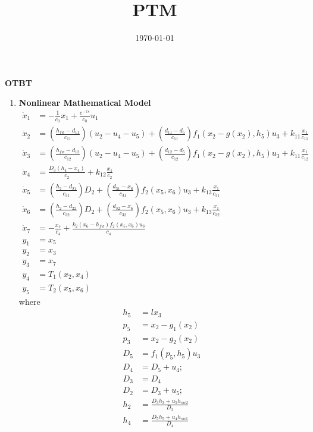 \documentclass[11pt, a4paper, fleqn]{article}
\author{}
\title{PTM \exercise}
\date{\today}
\newcommand{\exercise}{OTBT}
\begin{document}
\begin{center}
	{\Large \bfseries \exercise}\\
	\vspace{6pt}
\end{center}

\begin{enumerate}

\item \textbf{Nonlinear Mathematical Model}
	\begin{align*}
	\dot{x}_1 &= - \frac{1}{c_0}x_1 + \frac{e^{-\tau s}}{c_0}u_1\\
	\dot{x}_2 &= \left( \frac{h_{fw} - d_{11}}{c_{11}} \right) (u_2-u_4-u_5) + \left( \frac{d_{11} - d_5}{c_{11}} \right) f_1(x_2-g(x_2), h_5)u_3 + k_{11}\frac{x_1}{c_{11}}\\
	\dot{x}_3 &= \left( \frac{h_{fw} - d_{12}}{c_{12}} \right) (u_2-u_4-u_5) + \left( \frac{d_{12} - d_5}{c_{12}} \right) f_1(x_2-g(x_2), h_5)u_3 + k_{11}\frac{x_1}{c_{12}}\\
	\dot{x}_4 &=  \frac{D_3(h_4-x_4)}{c_2} + k_{12}\frac{x_1}{c_2}\\
	\dot{x}_5 &= \left( \frac{h_2 - d_{21}}{c_{31}} \right)D_2 + \left( \frac{d_{31}-x_6}{c_{31}} \right)f_2(x_5,x_6)u_3 + k_{13}\frac{x_1}{c_{31}}\\
	\dot{x}_6 &= \left( \frac{h_2 - d_{22}}{c_{32}} \right)D_2 + \left( \frac{d_{32}-x_6}{c_{32}} \right)f_2(x_5,x_6)u_3 + k_{13}\frac{x_1}{c_{32}}\\
	\dot{x}_7 &= - \frac{x_7}{c_4} + \frac{k_2(x_6-h_{fw})f_2(x_5,x_6)u_3}{c_4}\\
	y_1 &= x_5 \\
	y_2 &= x_3 \\
	y_3 &= x_7 \\
	y_4 &= T_1(x_2,x_4)\\
	y_5 &= T_2(x_5,x_6)
	\end{align*}
	where
	\begin{align*}
		h_5 &= lx_3\\
		p_5 &= x_2 - g_1(x_2)\\
		p_3 &= x_2 - g_2(x_2)\\
		D_5 &= f_1(p_5,h_5)u_3\\
		D_4 &= D_5 + u_4;\\
		D_3 &= D_4\\
		D_2 &= D_3 + u_5;\\
		h_2 &= \frac{D_3h_3 + u_5h_{sw2}}{D_2}\\
		h_4 &= \frac{D_5h_5 + u_4h_{sw1}}{D_4}		
	\end{align*}


\end{enumerate}
\end{document}
